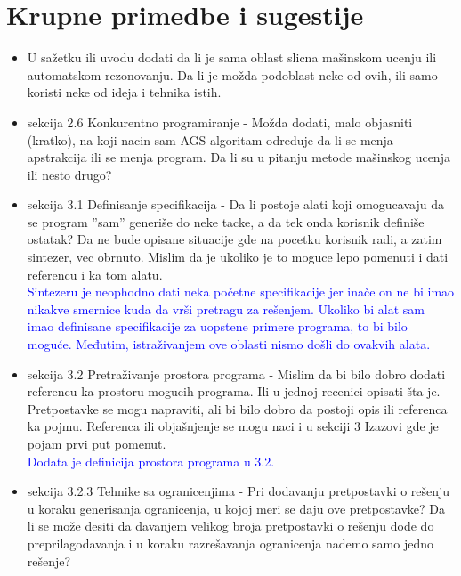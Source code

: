 \documentclass[a4paper]{report}
\newcommand{\odgovor}[1]{\textcolor{blue}{#1}}
\begin{document}
\section{Krupne primedbe i sugestije}
\begin{itemize}
    \item U sažetku ili uvodu dodati da li je sama oblast slicna mašinskom ucenju ili automatskom rezonovanju. Da li je možda podoblast neke od ovih, ili samo koristi neke od ideja i tehnika istih.\\
    \item sekcija 2.6 Konkurentno programiranje - Možda dodati, malo objasniti (kratko), na koji nacin sam AGS algoritam odreduje da li se menja apstrakcija ili se menja program. Da li su u pitanju metode mašinskog ucenja ili nesto drugo?\\
    \item sekcija 3.1 Definisanje specifikacija - Da li postoje alati koji omogucavaju da se program ''sam'' generiše do neke tacke, a da tek onda korisnik definiše ostatak? Da ne bude opisane situacije gde na pocetku korisnik radi, a zatim sintezer, vec obrnuto. Mislim da je ukoliko je to moguce lepo pomenuti i dati referencu i ka tom alatu.\\
    \odgovor {Sintezeru je neophodno dati neka početne specifikacije jer inače on ne bi imao nikakve smernice kuda da vrši pretragu za rešenjem. Ukoliko bi alat sam imao definisane specifikacije za uopstene primere programa, to bi bilo moguće. Međutim, istraživanjem ove oblasti nismo došli do ovakvih alata.}
    \item sekcija 3.2 Pretraživanje prostora programa - Mislim da bi bilo dobro dodati referencu ka prostoru mogucih programa. Ili u jednoj recenici opisati šta je. Pretpostavke se mogu napraviti, ali bi bilo dobro da postoji opis ili referenca ka pojmu. Referenca ili objašnjenje se mogu naci i u sekciji 3 Izazovi gde je pojam prvi put pomenut.\\
    \odgovor {Dodata je definicija prostora programa u 3.2.}
    \item sekcija 3.2.3 Tehnike sa ogranicenjima - Pri dodavanju pretpostavki o rešenju u koraku generisanja ogranicenja, u kojoj meri se daju ove pretpostavke? Da li se može desiti da davanjem velikog broja pretpostavki o rešenju dode do preprilagodavanja i u koraku razrešavanja ogranicenja nademo samo jedno rešenje?\\

\end{itemize}
\end{document}
